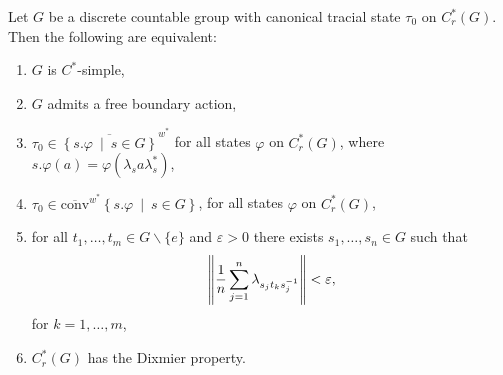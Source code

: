 \begin{theorem}
	Let $G$ be a discrete countable group with canonical tracial state $\tau_0$ on $C_r^*(G)$. Then the following are equivalent:
	\begin{enumerate}
		\item $G$ is $C^*$-simple,
		\item $G$ admits a free boundary action,
		\item $\tau_0 \in\overline{ \left\{ s.\varphi \ \mid \ s \in G \right\}}^{w^*}$ for all states $\varphi $ on $C_r^*(G)$, where $s.\varphi(a) = \varphi(\lambda_s a \lambda_s^*)$,
		\item $\tau_0 \in \overline{\mathrm{conv}}^{w^*}\left\{ s . \varphi \ \mid \ s \in G \right\}$, for all states $\varphi$ on $C_r^*(G)$,
		\item for all $t_1,\dots,t_m \in G\backslash\{e\}$ and $\varepsilon > 0$ there exists $s_1,\dots,s_n \in G$ such that
			\begin{align*}
				\left\lVert \frac1n \sum_{j=1}^n \lambda_{s_jt_ks_j^{-1}}\right\rVert < \varepsilon,
			\end{align*}
			for $k=1,\dots,m$,
		\item $C_r^*(G)$ has the Dixmier property.
	\end{enumerate}
	\label{uffecsimple}
\end{theorem}

